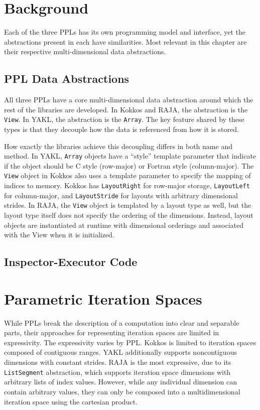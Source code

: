\section{Background}

Each of the three PPLs has its own programming model and interface, yet the abstractions present in each have similarities.
Most relevant in this chapter are their respective multi-dimensional data abstractions.

\subsection{PPL Data Abstractions}

All three PPLs have a core multi-dimensional data abstraction around which the rest of the libraries are developed.
In Kokkos and RAJA, the abstraction is the \verb.View..
In YAKL, the abstraction is the \verb.Array..
The key feature shared by these types is that they decouple how the data is referenced from how it is stored.

How exactly the libraries achieve this decoupling differs in both name and method.
In YAKL, \verb.Array. objects have a ``style'' template parameter that indicate if the object should be C style (row-major) or Fortran style (column-major). 
The \verb.View. object in Kokkos also uses a template parameter to specify the mapping of indices to memory.
Kokkos has \verb.LayoutRight. for row-major storage, \verb.LayoutLeft. for column-major, and \verb.LayoutStride. for layouts with arbitrary dimensional strides.
In RAJA, the \verb.View. object is templated by a layout type as well, but the layout type itself does not specify the ordering of the dimensions. 
Instead, layout objects are instantiated at runtime with dimensional orderings and associated with the View when it is initialized.

\subsection{Inspector-Executor Code}


\section{Parametric Iteration Spaces}

While PPLs break the description of a computation into clear and separable parts, their approaches for representing iteration spaces are limited in expressivity.
The expressivity varies by PPL\@.
Kokkos is limited to iteration spaces composed of contiguous ranges.
YAKL additionally supports noncontiguous dimensions with constant strides.
RAJA is the most expressive, due to its \verb.ListSegment. abstraction, which supports iteration space dimensions with arbitrary lists of index values.
However, while any individual dimension can contain arbitrary values, they can only be composed into a multidimensional iteration space using the cartesian product.

